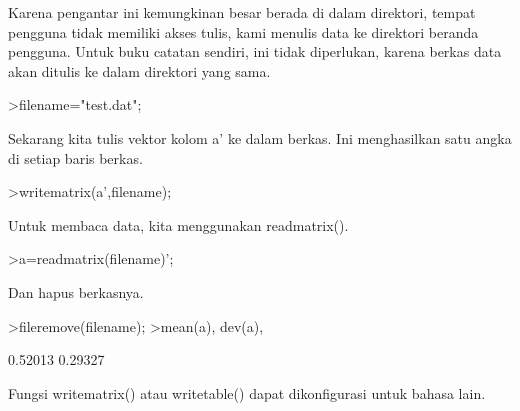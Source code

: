 \documentclass[a4paper,10pt]{article}
\begin{document}
\begin{eulernotebook}
\begin{eulercomment}
\begin{eulercomment}
\begin{eulercomment}
\begin{eulercomment}
\begin{eulercomment}
\begin{eulercomment}
\begin{eulercomment}
\begin{eulercomment}
\begin{eulercomment}
\begin{eulercomment}
\begin{eulercomment}
\begin{eulercomment}
\begin{eulercomment}
\begin{eulercomment}
\begin{eulercomment}
\begin{eulercomment}
\begin{eulercomment}
\begin{eulercomment}
\begin{eulercomment}
\begin{eulercomment}
\begin{eulercomment}
\begin{eulercomment}
\begin{eulercomment}
\begin{eulercomment}
\begin{eulercomment}
\begin{eulercomment}
\begin{eulercomment}
\begin{eulercomment}
\begin{eulercomment}
\begin{eulercomment}
\begin{eulercomment}
\begin{eulercomment}
\begin{eulercomment}
\begin{eulercomment}
\begin{eulercomment}
\begin{eulercomment}
\begin{eulercomment}
Karena pengantar ini kemungkinan besar berada di dalam direktori,
tempat pengguna tidak memiliki akses tulis, kami menulis data ke
direktori beranda pengguna. Untuk buku catatan sendiri, ini tidak
diperlukan, karena berkas data akan ditulis ke dalam direktori yang
sama.
\end{eulercomment}
\begin{eulerprompt}
>filename="test.dat";
\end{eulerprompt}
\begin{eulercomment}
Sekarang kita tulis vektor kolom a' ke dalam berkas. Ini menghasilkan
satu angka di setiap baris berkas.
\end{eulercomment}
\begin{eulerprompt}
>writematrix(a',filename);
\end{eulerprompt}
\begin{eulercomment}
Untuk membaca data, kita menggunakan readmatrix().
\end{eulercomment}
\begin{eulerprompt}
>a=readmatrix(filename)';
\end{eulerprompt}
\begin{eulercomment}
Dan hapus berkasnya.
\end{eulercomment}
\begin{eulerprompt}
>fileremove(filename);
>mean(a), dev(a),
\end{eulerprompt}
\begin{euleroutput}
  0.52013
  0.29327
\end{euleroutput}
\begin{eulercomment}
Fungsi writematrix() atau writetable() dapat dikonfigurasi untuk
bahasa lain.


\end{eulercomment}
\end{eulercomment}
\end{eulercomment}
\end{eulercomment}
\end{eulercomment}
\end{eulercomment}
\end{eulercomment}
\end{eulercomment}
\end{eulercomment}
\end{eulercomment}
\end{eulercomment}
\end{eulercomment}
\end{eulercomment}
\end{eulercomment}
\end{eulercomment}
\end{eulercomment}
\end{eulercomment}
\end{eulercomment}
\end{eulercomment}
\end{eulercomment}
\end{eulercomment}
\end{eulercomment}
\end{eulercomment}
\end{eulercomment}
\end{eulercomment}
\end{eulercomment}
\end{eulercomment}
\end{eulercomment}
\end{eulercomment}
\end{eulercomment}
\end{eulercomment}
\end{eulercomment}
\end{eulercomment}
\end{eulercomment}
\end{eulercomment}
\end{eulercomment}
\end{eulercomment}
\end{eulernotebook}
\end{document}
